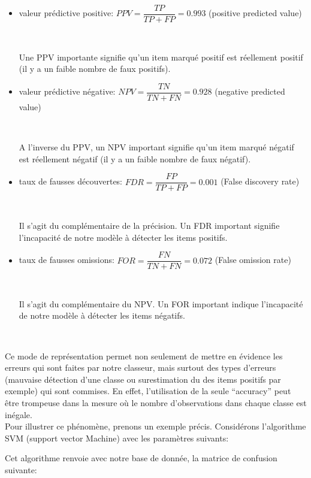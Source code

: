 \documentclass[a4paper]{report}
\begin{document}
\begin{itemize}
\item valeur prédictive positive: $PPV=\dfrac{TP}{TP+FP}=0.993$  (positive predicted value)

~\par

Une PPV importante signifie qu'un item marqué positif est réellement positif (il y a un faible nombre de faux positifs). 

\item valeur prédictive négative: $NPV=\dfrac{TN}{TN+FN}=0.928$ (negative predicted value)

~\par

A l'inverse du PPV, un NPV important signifie qu'un item marqué négatif est réellement négatif (il y a un faible nombre de faux négatif).


\item taux de fausses découvertes: $FDR=\dfrac{FP}{TP+FP}=0.001$   (False discovery rate)

~\par

Il s'agit du complémentaire de la précision. Un FDR important signifie l'incapacité de notre modèle à détecter les items positifs. 

\item taux de fausses omissions: $FOR=\dfrac{FN}{TN+FN}=0.072$ (False omission rate)

~\par

Il s'agit du complémentaire du NPV. Un FOR important indique l'incapacité de notre modèle à détecter les items négatifs. 

\end{itemize}

~\par


Ce mode de représentation permet non seulement de mettre en évidence les erreurs qui sont faites par notre classeur, mais surtout des types d'erreurs (mauvaise détection d'une classe ou surestimation du des items positifs par exemple) qui sont commises. En effet, l'utilisation de la seule “accuracy” peut être trompeuse dans la mesure où le nombre d'observations dans chaque classe est inégale. \\
\medskip
Pour illustrer ce phénomène, prenons un exemple précis. Considérons l'algorithme SVM (support vector Machine) avec les paramètres suivants:
\medbreak

\begin{center}
\noindent
{}
\end{center}
\medbreak
Cet algorithme renvoie avec notre base de donnée, la matrice de confusion suivante: 
\end{document}

